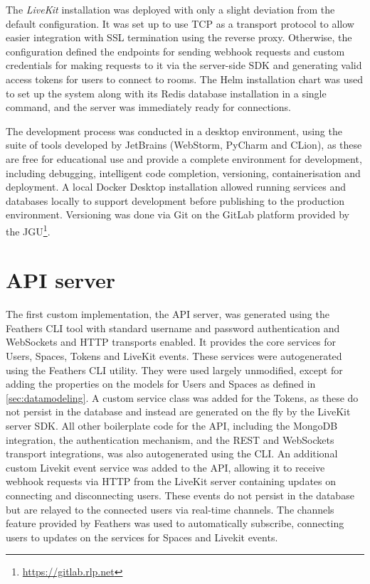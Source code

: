 The \emph{LiveKit} installation was deployed with only a slight deviation from the default configuration.
It was set up to use \ac{TCP} as a transport protocol to allow easier integration with \ac{SSL} termination using the reverse proxy.
Otherwise, the configuration defined the endpoints for sending webhook requests and custom credentials for making requests to it via the server-side \ac{SDK} and generating valid access tokens for users to connect to rooms.
The Helm installation chart was used to set up the system along with its Redis database installation in a single command, and the server was immediately ready for connections.

The development process was conducted in a desktop environment, using the suite of tools developed by JetBrains (WebStorm, PyCharm and CLion), as these are free for educational use and provide a complete environment for development, including debugging, intelligent code completion, versioning, containerisation and deployment.
A local Docker Desktop installation allowed running services and databases locally to support development before publishing to the production environment.
Versioning was done via Git on the GitLab platform provided by the \ac{JGU}\footnote{\url{https://gitlab.rlp.net}}.

\section{API server}
\label{sec:api-server}

The first custom implementation, the \ac{API} server, was generated using the Feathers \ac{CLI} tool with standard username and password authentication and WebSockets and \ac{HTTP} transports enabled.
It provides the core services for Users, Spaces, Tokens and LiveKit events.
These services were autogenerated using the Feathers \ac{CLI} utility.
They were used largely unmodified, except for adding the properties on the models for Users and Spaces as defined in \autoref{sec:datamodeling}.
A custom service class was added for the Tokens, as these do not persist in the database and instead are generated on the fly by the LiveKit server \ac{SDK}.
All other boilerplate code for the \ac{API}, including the MongoDB integration, the authentication mechanism, and the REST and WebSockets transport integrations, was also autogenerated using the \ac{CLI}.
An additional custom Livekit event service was added to the API, allowing it to receive webhook requests via \ac{HTTP} from the LiveKit server containing updates on connecting and disconnecting users.
These events do not persist in the database but are relayed to the connected users via real-time channels.
The channels feature provided by Feathers was used to automatically subscribe, connecting users to updates on the services for Spaces and Livekit events.

